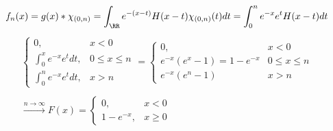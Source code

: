 \begin{equation*}
f_{n} (x) = g(x)*\chi_{(0, n)} = \int_{\RR} e^{- (x - t)} H(x - t)\chi_{(0, n)} (t)dt = \int^{n}_{0} e^{- x} e^{t} H(x - t)dt
\end{equation*}
\begin{gather*}
\begin{cases}
0, & x < 0\\
\int^{x}_{0} e^{- x} e^{t} dt, & 0 \leq x \leq n\\
\int^{n}_{0} e^{- x} e^{t} dt, & x > n
\end{cases} =
\begin{cases}
0, & x < 0\\
e^{- x}\left(e^{x} - 1\right) = 1 - e^{- x} & 0 \leq x \leq n\\
e^{- x} (e^{n} - 1) & x > n
\end{cases}\\
\\
\xrightarrow{n\rightarrow \infty} F(x) =
\begin{cases}
0, & x < 0\\
1 - e^{- x}, & x \geq 0
\end{cases}
\end{gather*}
